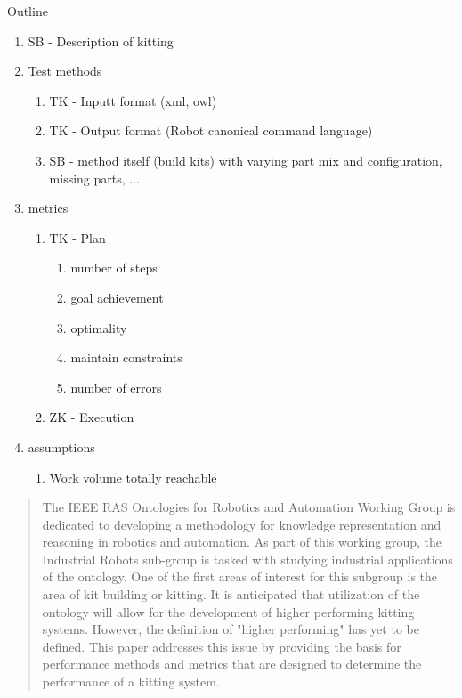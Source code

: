 



\begin {center}
{\huge{Outline}}
\end {center}

\begin{enumerate}
\item SB - Description of kitting
\item Test methods
	\begin{enumerate}
	\item TK -  Inputt format (xml, owl)
	\item TK - Output format (Robot canonical command language)
	\item SB - method itself (build kits) with varying part mix and configuration, missing parts, ...
	\end{enumerate}
\item metrics
	\begin{enumerate}
	\item TK -  Plan
		\begin{enumerate}
		\item number of steps
		\item goal achievement
		\item optimality
		\item maintain constraints
		\item number of errors
		\end {enumerate}
	\item ZK -  Execution
	\end {enumerate}
\item assumptions
	\begin {enumerate}
	\item Work volume totally reachable
	\end {enumerate}
\end{enumerate}


\maketitle
\thispagestyle{empty}
\pagestyle{empty}


\begin{abstract}

The IEEE RAS Ontologies for Robotics and Automation Working Group is dedicated to developing a methodology for knowledge representation and reasoning in robotics and automation. As part of this working group, the Industrial Robots sub-group is tasked with studying industrial applications of the ontology. One of the first areas of interest for this subgroup is the area of kit building or kitting. It is anticipated that
utilization of the ontology will allow for the development of higher performing kitting systems. However, the definition of "higher performing"
has yet to be defined. This paper addresses this issue by providing the basis for performance methods and metrics that are designed to
determine the performance of a kitting system.
\end{abstract}


